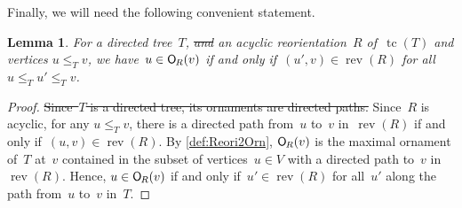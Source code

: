 \documentclass{amsart}
\newtheorem{lemma}[theorem]{Lemma}
\theoremstyle{definition}
\renewcommand{\c}[1]{\mathcal{#1}} %
\newcommand{\ssm}{\smallsetminus} %
\DeclareMathOperator{\tc}{tc} %
\newcommand{\Vincent}[1]{\todo[size=\tiny,color=blue!30]{ #1 \\ \hfill --- V.}\,}
\newcommand{\jose}[1]{{\color{red}#1}}
\newcommand{\mymap}[2]{\mathsf{#1}_{\hspace{-.7pt}#2}}
\DeclareMathOperator{\Orn}{\c{O}}  %
\newcommand{\orn}[1]{\mymap{O}{#1}}  %
\DeclareMathOperator{\rev}{rev} %
\begin{document}
%


Finally, we will need the following convenient statement.

\begin{lemma}
\label{lem:Reori2OrnT}
For a directed tree~$T$\jose{,\sout{ and}} an acyclic reorientation~$R$ of~$\tc(T)$\jose{ and vertices $u \le_T v$}, we have~$u \in \orn{R}(v)$ if and only if~$(u',v) \in \rev(R)$ for all~$u \le_T u' \le_T v$.
\end{lemma}

\begin{proof}
\jose{\sout{Since~$T$ is a directed tree, its ornaments are directed paths.}}
Since~$R$ is acyclic, \jose{for any $u \le_T v$,} there is a directed path from~$u$ to~$v$ in~$\rev(R)$ if and only if~$(u,v) \in \rev(R)$.
By \cref{def:Reori2Orn}, $\orn{R}(v)$ is the maximal ornament of~$T$ at~$v$ contained in the subset of vertices~$u \in V$ with a directed path to~$v$ in $\rev(R)$.
Hence, $u \in \orn{R}(v)$ if and only if~$u' \in \rev(R)$ for all~$u'$ along the path from~$u$ to~$v$ in~$T$.
\end{proof}

\end{document}
